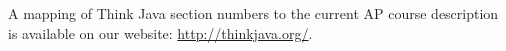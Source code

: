 A mapping of Think Java section numbers to the current AP course description is available on our website: \url{http://thinkjava.org/}.
